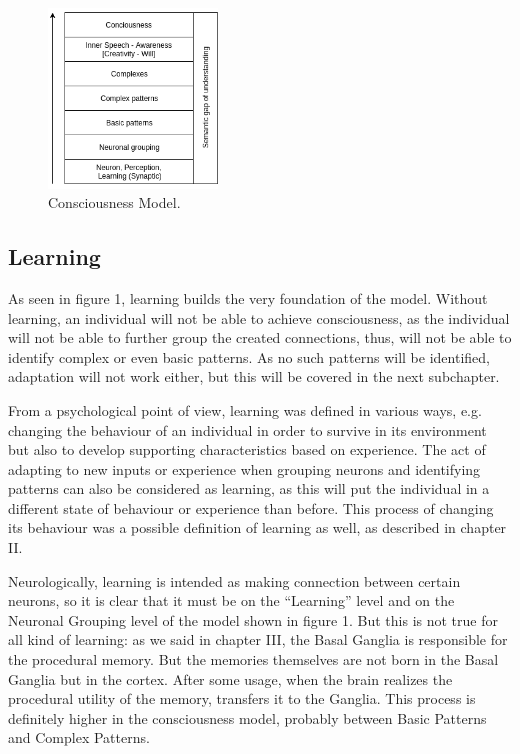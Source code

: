 \documentclass[conference]{IEEEtran}
\begin{document}
	\begin{figure}[htbp]
		\centerline{\includegraphics[width=0.4\textwidth]{consciousness_model.png}}
		\caption{Consciousness Model.}
		\label{figure 1}
	\end{figure}

	\subsection{Learning}\label{Le}
	As seen in figure 1, learning builds the very foundation of the model. Without learning, an individual will not be able to achieve consciousness, as the individual will not be able to further group the created connections, thus, will not be able to identify complex or even basic patterns. As no such patterns will be identified, adaptation will not work either, but this will be covered in the next subchapter.

	From a psychological point of view, learning was defined in various ways, e.g. changing the behaviour of an individual in order to survive in its environment but also to develop supporting characteristics based on experience. The act of adapting to new inputs or experience when grouping neurons and identifying patterns can also be considered as learning, as this will put the individual in a different state of behaviour or experience than before. This process of changing its behaviour was a possible definition of learning as well, as described in chapter II.

	Neurologically, learning is intended as making connection between certain neurons, so it is clear that it must be on the ``Learning'' level and on the Neuronal Grouping level of the model shown in figure 1. But this is not true for all kind of learning: as we said in chapter III, the Basal Ganglia is responsible for the procedural memory. But the memories themselves are not born in the Basal Ganglia but in the cortex. After some usage, when the brain realizes the procedural utility of the memory, transfers it to the Ganglia. This process is definitely higher in the consciousness model, probably between Basic Patterns and Complex Patterns.
\end{document}
